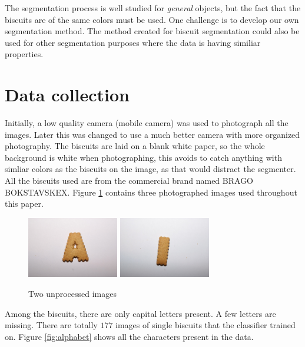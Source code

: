 \documentclass[a4paper,11pt]{article}
\begin{document}
The segmentation process is well studied for \emph{general} objects, but the fact that the biscuits are of the same colors must be used.
One challenge is to develop our own segmentation method.
The method created for biscuit segmentation could also be used for other segmentation purposes where the data is having similiar properties.

\section{Data collection}
Initially, a low quality camera (mobile camera) was used to photograph all the images.
Later this was changed to use a much better camera with more organized photography.
The biscuits are laid on a blank white paper, so the whole background is white when photographing, this avoids to catch anything with simliar colors as the biscuits on the image, as that would distract the segmenter.
All the biscuits used are from the commercial brand named BRAGO BOKSTAVSKEX.
Figure \ref{fig:unprocessed} contains three photographed images used throughout this paper.

\begin{figure}[]
\begin{center}
\includegraphics[width=40mm]{orig_a.JPG}
\includegraphics[width=40mm]{orig_i.JPG}
\end{center}
\caption{Two unprocessed images}
\label{fig:unprocessed}
\end{figure}

Among the biscuits, there are only capital letters present. A few letters are missing.
There are totally $177$ images of single biscuits that the classifier trained on.
Figure \ref{fig:alphabet} shows all the characters present in the data.
\end{document}
